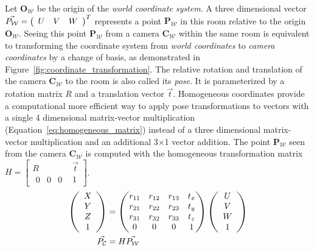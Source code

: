 Let $\mathbf{O_\mathcal{W}}$ be the origin of the \emph{world coordinate system}.
A three dimensional vector $\vec{P_\mathcal{W}} = \left(\begin{array}{ccc} U & V & W \end{array}\right)^T$ represents a point $\mathbf{P_\mathcal{W}}$ in this room relative to the origin $\mathbf{O_\mathcal{W}}$.
Seeing this point $\mathbf{P_\mathcal{W}}$ from a camera $\mathbf{C_\mathcal{W}}$ within the same room is equivalent to transforming the coordinate system from \emph{world coordinates} to \emph{camera coordinates} by a change of basis, as demonstrated in Figure~\ref{fig:coordinate_transformation}.
The relative rotation and translation of the camera $\mathbf{C_\mathcal{W}}$ to the room is also called its \emph{pose}\cite[p.15-39]{corke_2011}.
It is parameterized by a rotation matrix $R$ and a translation vector $\vec{t}$.
Homogeneous coordinates provide a computational more efficient way to apply pose transformations to vectors with a single 4 dimensional matrix-vector multiplication (Equation~\ref{eq:homogeneous_matrix}) instead of a three dimensional matrix-vector multiplication and an additional 3$\times$1 vector addition.
The point $\mathbf{P_\mathcal{W}}$ seen from the camera $\mathbf{C_\mathcal{W}}$ is computed with the homogeneous transformation matrix $H = \begin{bmatrix} R & \vec{t} \\ \begin{matrix}0 & 0 & 0\end{matrix} & 1 \end{bmatrix}$.
\begin{equation}
\begin{aligned}
    \left(\begin{array}{c} X \\ Y \\ Z \\ 1\end{array}\right)&= \begin{pmatrix}
        r_{11} & r_{12} & r_{13} & t_x \\
        r_{21} & r_{22} & r_{23} & t_y \\
        r_{31} & r_{32} & r_{33} & t_z \\
        0      & 0      & 0      & 1 \\
    \end{pmatrix} \left(\begin{array}{c} U \\ V \\ W \\ 1\end{array}\right) \\
    \vec{P_\mathcal{C}} &= H \vec{P_\mathcal{W}}
\end{aligned}
\label{eq:homogeneous_matrix}
\end{equation}
